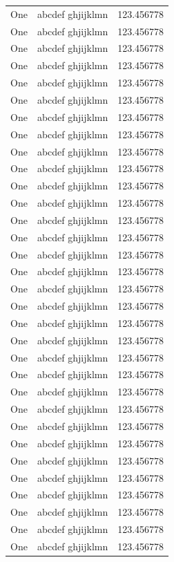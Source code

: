 \begin{center}
\begin{supertabular}[c]{|l|l|l|}
One & abcdef ghjijklmn & 123.456778 \\
One & abcdef ghjijklmn & 123.456778 \\
One & abcdef ghjijklmn & 123.456778 \\
One & abcdef ghjijklmn & 123.456778 \\
One & abcdef ghjijklmn & 123.456778 \\
One & abcdef ghjijklmn & 123.456778 \\
One & abcdef ghjijklmn & 123.456778 \\
One & abcdef ghjijklmn & 123.456778 \\
One & abcdef ghjijklmn & 123.456778 \\
One & abcdef ghjijklmn & 123.456778 \\
One & abcdef ghjijklmn & 123.456778 \\
One & abcdef ghjijklmn & 123.456778 \\
One & abcdef ghjijklmn & 123.456778 \\
One & abcdef ghjijklmn & 123.456778 \\
One & abcdef ghjijklmn & 123.456778 \\
One & abcdef ghjijklmn & 123.456778 \\
One & abcdef ghjijklmn & 123.456778 \\
One & abcdef ghjijklmn & 123.456778 \\
One & abcdef ghjijklmn & 123.456778 \\
One & abcdef ghjijklmn & 123.456778 \\
One & abcdef ghjijklmn & 123.456778 \\
One & abcdef ghjijklmn & 123.456778 \\
One & abcdef ghjijklmn & 123.456778 \\
One & abcdef ghjijklmn & 123.456778 \\
One & abcdef ghjijklmn & 123.456778 \\
One & abcdef ghjijklmn & 123.456778 \\
One & abcdef ghjijklmn & 123.456778 \\
One & abcdef ghjijklmn & 123.456778 \\
One & abcdef ghjijklmn & 123.456778 \\
One & abcdef ghjijklmn & 123.456778 \\
One & abcdef ghjijklmn & 123.456778 \\
One & abcdef ghjijklmn & 123.456778 \\

\end{supertabular}
\end{center}
